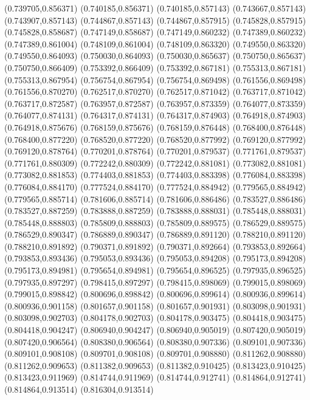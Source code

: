 (0.739705,0.856371)
(0.740185,0.856371)
(0.740185,0.857143)
(0.743667,0.857143)
(0.743907,0.857143)
(0.744867,0.857143)
(0.744867,0.857915)
(0.745828,0.857915)
(0.745828,0.858687)
(0.747149,0.858687)
(0.747149,0.860232)
(0.747389,0.860232)
(0.747389,0.861004)
(0.748109,0.861004)
(0.748109,0.863320)
(0.749550,0.863320)
(0.749550,0.864093)
(0.750030,0.864093)
(0.750030,0.865637)
(0.750750,0.865637)
(0.750750,0.866409)
(0.753392,0.866409)
(0.753392,0.867181)
(0.755313,0.867181)
(0.755313,0.867954)
(0.756754,0.867954)
(0.756754,0.869498)
(0.761556,0.869498)
(0.761556,0.870270)
(0.762517,0.870270)
(0.762517,0.871042)
(0.763717,0.871042)
(0.763717,0.872587)
(0.763957,0.872587)
(0.763957,0.873359)
(0.764077,0.873359)
(0.764077,0.874131)
(0.764317,0.874131)
(0.764317,0.874903)
(0.764918,0.874903)
(0.764918,0.875676)
(0.768159,0.875676)
(0.768159,0.876448)
(0.768400,0.876448)
(0.768400,0.877220)
(0.768520,0.877220)
(0.768520,0.877992)
(0.769120,0.877992)
(0.769120,0.878764)
(0.770201,0.878764)
(0.770201,0.879537)
(0.771761,0.879537)
(0.771761,0.880309)
(0.772242,0.880309)
(0.772242,0.881081)
(0.773082,0.881081)
(0.773082,0.881853)
(0.774403,0.881853)
(0.774403,0.883398)
(0.776084,0.883398)
(0.776084,0.884170)
(0.777524,0.884170)
(0.777524,0.884942)
(0.779565,0.884942)
(0.779565,0.885714)
(0.781606,0.885714)
(0.781606,0.886486)
(0.783527,0.886486)
(0.783527,0.887259)
(0.783888,0.887259)
(0.783888,0.888031)
(0.785448,0.888031)
(0.785448,0.888803)
(0.785809,0.888803)
(0.785809,0.889575)
(0.786529,0.889575)
(0.786529,0.890347)
(0.786889,0.890347)
(0.786889,0.891120)
(0.788210,0.891120)
(0.788210,0.891892)
(0.790371,0.891892)
(0.790371,0.892664)
(0.793853,0.892664)
(0.793853,0.893436)
(0.795053,0.893436)
(0.795053,0.894208)
(0.795173,0.894208)
(0.795173,0.894981)
(0.795654,0.894981)
(0.795654,0.896525)
(0.797935,0.896525)
(0.797935,0.897297)
(0.798415,0.897297)
(0.798415,0.898069)
(0.799015,0.898069)
(0.799015,0.898842)
(0.800696,0.898842)
(0.800696,0.899614)
(0.800936,0.899614)
(0.800936,0.901158)
(0.801657,0.901158)
(0.801657,0.901931)
(0.803098,0.901931)
(0.803098,0.902703)
(0.804178,0.902703)
(0.804178,0.903475)
(0.804418,0.903475)
(0.804418,0.904247)
(0.806940,0.904247)
(0.806940,0.905019)
(0.807420,0.905019)
(0.807420,0.906564)
(0.808380,0.906564)
(0.808380,0.907336)
(0.809101,0.907336)
(0.809101,0.908108)
(0.809701,0.908108)
(0.809701,0.908880)
(0.811262,0.908880)
(0.811262,0.909653)
(0.811382,0.909653)
(0.811382,0.910425)
(0.813423,0.910425)
(0.813423,0.911969)
(0.814744,0.911969)
(0.814744,0.912741)
(0.814864,0.912741)
(0.814864,0.913514)
(0.816304,0.913514)
